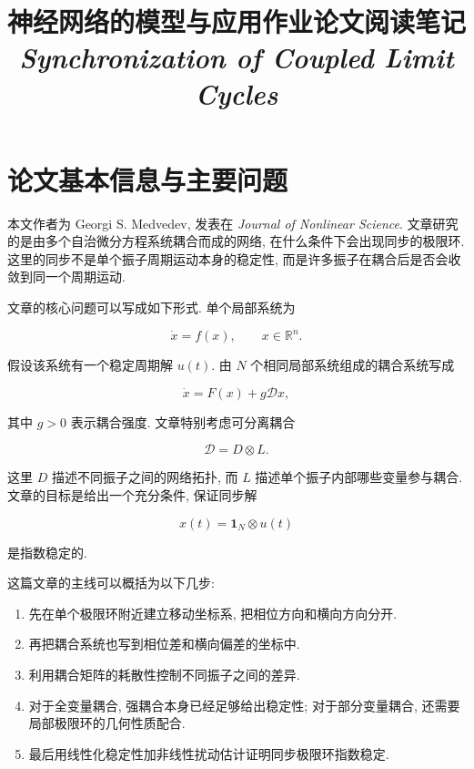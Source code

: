 \documentclass[oneside]{ctexart}
\title{神经网络的模型与应用作业论文阅读笔记\\[0.6ex]
\large \textit{Synchronization of Coupled Limit Cycles}}
\author{}
\date{}
\begin{document}
\maketitle

\section{论文基本信息与主要问题}

本文作者为 Georgi S. Medvedev, 发表在 \textit{Journal of Nonlinear Science}. 文章研究的是由多个自治微分方程系统耦合而成的网络, 在什么条件下会出现同步的极限环. 这里的同步不是单个振子周期运动本身的稳定性, 而是许多振子在耦合后是否会收敛到同一个周期运动.

文章的核心问题可以写成如下形式. 单个局部系统为

\begin{equation}
    \dot{x}=f(x), \qquad x\in \mathbb{R}^n.
\end{equation}

假设该系统有一个稳定周期解 $u(t)$. 由 $N$ 个相同局部系统组成的耦合系统写成

\begin{equation}
    \dot{x}=F(x)+g\mathcal{D}x,
\end{equation}

其中 $g>0$ 表示耦合强度. 文章特别考虑可分离耦合

\begin{equation}
    \mathcal{D}=D\otimes L.
\end{equation}

这里 $D$ 描述不同振子之间的网络拓扑, 而 $L$ 描述单个振子内部哪些变量参与耦合. 文章的目标是给出一个充分条件, 保证同步解

\begin{equation}
    x(t)=\mathbf{1}_N\otimes u(t)
\end{equation}

是指数稳定的.

这篇文章的主线可以概括为以下几步:

\begin{enumerate}[(1)]
    \item 先在单个极限环附近建立移动坐标系, 把相位方向和横向方向分开.
    \item 再把耦合系统也写到相位差和横向偏差的坐标中.
    \item 利用耦合矩阵的耗散性控制不同振子之间的差异.
    \item 对于全变量耦合, 强耦合本身已经足够给出稳定性; 对于部分变量耦合, 还需要局部极限环的几何性质配合.
    \item 最后用线性化稳定性加非线性扰动估计证明同步极限环指数稳定.
\end{enumerate}
\end{document}
